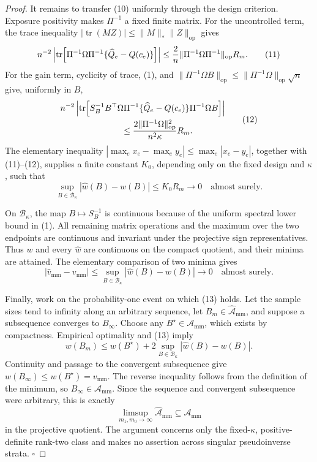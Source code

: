 \documentclass{article}
\begin{document}
\begin{proof}
It remains to transfer (10) uniformly through the design criterion.  Exposure positivity makes \(\Pi^{-1}\) a fixed finite matrix.  For the uncontrolled term, the trace inequality \(|\operatorname{tr}(MZ)|\le\lVert M\rVert_*\lVert Z\rVert_{\mathrm{op}}\) gives
\[
n^{-2}\left|
\operatorname{tr}\!\left[\Pi^{-1}\Omega\Pi^{-1}
\{\widehat Q_e-Q(c_e)\}\right]\right|
\le {2\over n}\lVert\Pi^{-1}\Omega\Pi^{-1}\rVert_{\mathrm{op}}R_m.
\tag{11}
\]
For the gain term, cyclicity of trace, (1), and
\(\lVert\Pi^{-1}\Omega B\rVert_{\mathrm{op}}
\le\lVert\Pi^{-1}\Omega\rVert_{\mathrm{op}}\sqrt n\) give, uniformly in \(B\),
\[
\begin{split}
&n^{-2}\left|\operatorname{tr}\!\left[
S_B^{-1}B^{\top}\Omega\Pi^{-1}
\{\widehat Q_e-Q(c_e)\}
\Pi^{-1}\Omega B\right]\right|\\
&\hspace{25mm}\le
{2\lVert\Pi^{-1}\Omega\rVert_{\mathrm{op}}^2
\over n^2\kappa}R_m.
\end{split}
\tag{12}
\]
The elementary inequality
\(\left|\max_e x_e-\max_e y_e\right|\le\max_e|x_e-y_e|\), together with (11)--(12), supplies a finite constant \(K_0\), depending only on the fixed design and \(\kappa\), such that
\[
\sup_{B\in\mathcal B_\kappa}|\widehat w(B)-w(B)|
\le K_0R_m\longrightarrow0
\quad\text{almost surely}.
\tag{13}
\]

On \(\mathcal B_\kappa\), the map \(B\mapsto S_B^{-1}\) is continuous because of the uniform spectral lower bound in (1).  All remaining matrix operations and the maximum over the two endpoints are continuous and invariant under the projective sign representatives.  Thus \(w\) and every \(\widehat w\) are continuous on the compact quotient, and their minima are attained.  The elementary comparison of two minima gives
\[
|\widehat v_{\mathrm{mm}}-v_{\mathrm{mm}}|
\le\sup_{B\in\mathcal B_\kappa}|\widehat w(B)-w(B)|
\longrightarrow0
\quad\text{almost surely}.
\tag{14}
\]

Finally, work on the probability-one event on which (13) holds.  Let the sample sizes tend to infinity along an arbitrary sequence, let \(B_m\in\widehat{\mathcal A}_{\mathrm{mm}}\), and suppose a subsequence converges to \(B_\infty\).  Choose any \(B^\star\in\mathcal A_{\mathrm{mm}}\), which exists by compactness.  Empirical optimality and (13) imply
\[
w(B_m)
\le w(B^\star)+2\sup_{B\in\mathcal B_\kappa}
|\widehat w(B)-w(B)|.
\tag{15}
\]
Continuity and passage to the convergent subsequence give \(w(B_\infty)\le w(B^\star)=v_{\mathrm{mm}}\).  The reverse inequality follows from the definition of the minimum, so \(B_\infty\in\mathcal A_{\mathrm{mm}}\).  Since the sequence and convergent subsequence were arbitrary, this is exactly
\[
\limsup_{m_1,m_0\to\infty}\widehat{\mathcal A}_{\mathrm{mm}}
\subseteq\mathcal A_{\mathrm{mm}}
\]
in the projective quotient.  The argument concerns only the fixed-\(\kappa\), positive-definite rank-two class and makes no assertion across singular pseudoinverse strata. \(\square\)
\end{proof}
\end{document}
